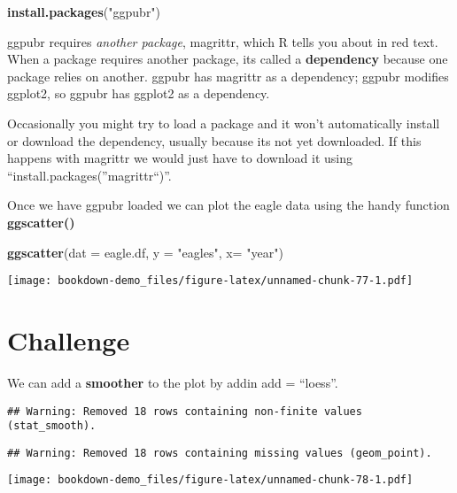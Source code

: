 \documentclass[]{book}
\newenvironment{Shaded}{\begin{snugshade}}{\end{snugshade}}
\newcommand{\KeywordTok}[1]{\textcolor[rgb]{0.13,0.29,0.53}{\textbf{#1}}}
\newcommand{\DataTypeTok}[1]{\textcolor[rgb]{0.13,0.29,0.53}{#1}}
\newcommand{\StringTok}[1]{\textcolor[rgb]{0.31,0.60,0.02}{#1}}
\newcommand{\NormalTok}[1]{#1}
\theoremstyle{definition}
\theoremstyle{definition}
\theoremstyle{definition}
\theoremstyle{remark}
\begin{document}
\begin{Shaded}
\begin{Highlighting}[]
\KeywordTok{install.packages}\NormalTok{(}\StringTok{"ggpubr"}\NormalTok{)}
\end{Highlighting}
\end{Shaded}

ggpubr requires \emph{another package}, magrittr, which R tells you
about in red text. When a package requires another package, its called a
\textbf{dependency} because one package relies on another. ggpubr has
magrittr as a dependency; ggpubr modifies ggplot2, so ggpubr has ggplot2
as a dependency.

Occasionally you might try to load a package and it won't automatically
install or download the dependency, usually because its not yet
downloaded. If this happens with magrittr we would just have to download
it using ``install.packages(''magrittr``)''.

Once we have ggpubr loaded we can plot the eagle data using the handy
function \textbf{ggscatter()}

\begin{Shaded}
\begin{Highlighting}[]
\KeywordTok{ggscatter}\NormalTok{(}\DataTypeTok{dat =}\NormalTok{ eagle.df, }\DataTypeTok{y =} \StringTok{"eagles"}\NormalTok{, }\DataTypeTok{x=} \StringTok{"year"}\NormalTok{)}
\end{Highlighting}
\end{Shaded}

\texttt{[image: bookdown-demo\_files/figure-latex/unnamed-chunk-77-1.pdf]}

\section{Challenge}\label{challenge-1}

We can add a \textbf{smoother} to the plot by addin add = ``loess''.

\begin{verbatim}
## Warning: Removed 18 rows containing non-finite values (stat_smooth).
\end{verbatim}

\begin{verbatim}
## Warning: Removed 18 rows containing missing values (geom_point).
\end{verbatim}

\texttt{[image: bookdown-demo\_files/figure-latex/unnamed-chunk-78-1.pdf]}
\end{document}
